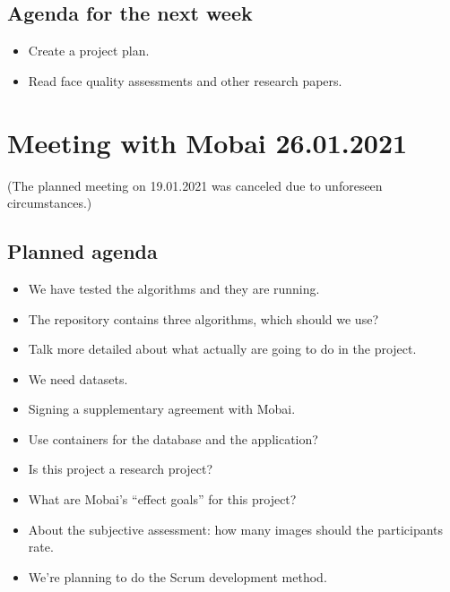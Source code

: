 \subsection*{Agenda for the next week}
\begin{itemize}
    \item Create a project plan.
    \item Read face quality assessments and other research papers.
\end{itemize}


\section*{Meeting with Mobai 26.01.2021}
(The planned meeting on 19.01.2021 was canceled due to unforeseen circumstances.) 

\subsection*{Planned agenda}
\begin{itemize}
    \item We have tested the algorithms and they are running.
    \item The repository contains three algorithms, which should we use?
    \item Talk more detailed about what actually are going to do in the project.
    \item We need datasets.
    \item Signing a supplementary agreement with Mobai.
    \item Use containers for the database and the application?
    \item Is this project a research project?
    \item What are Mobai’s “effect goals” for this project?
    \item About the subjective assessment: how many images should the participants rate.
    \item We’re planning to do the Scrum development method.
\end{itemize}

